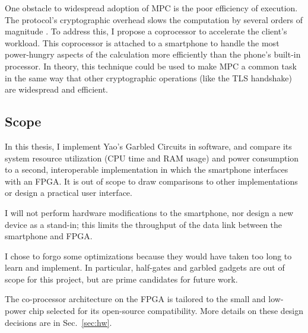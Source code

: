 One obstacle to widespread adoption of MPC is the poor efficiency of execution. The protocol's cryptographic overhead slows the computation by several orders of magnitude . To address this, I propose a coprocessor to accelerate the client's workload. This coprocessor is attached to a smartphone to handle the most power-hungry aspects of the calculation more efficiently than the phone's built-in processor. In theory, this technique could be used to make MPC a common task in the same way that other cryptographic operations (like the TLS handshake) are widespread and efficient.

\subsection{Scope}
In this thesis, I implement Yao's Garbled Circuits in software, and compare its system resource utilization (CPU time and RAM usage) and power consumption to a second, interoperable implementation in which the smartphone interfaces with an FPGA\@. It is out of scope to draw comparisons to other implementations or design a practical user interface.

I will not perform hardware modifications to the smartphone, nor design a new device as a stand-in; this limits the throughput of the data link between the smartphone and FPGA.

I chose to forgo some optimizations because they would have taken too long to learn and implement. In particular, half-gates and garbled gadgets are out of scope for this project, but are prime candidates for future work.

The co-processor architecture on the FPGA is tailored to the small and low-power chip selected for its open-source\cite{IceStorm} compatibility. More details on these design decisions are in Sec.~\ref{sec:hw}.
